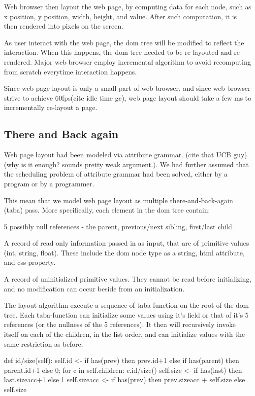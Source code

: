 \documentclass[format=acmsmall, review=false, screen=true]{acmart}
\begin{document}
Web browser then layout the web page, by computing data for each node, such as x position, y position, width, height, and value. After such computation, it is then rendered into pixels on the screen.

As user interact with the web page, the dom tree will be modified to reflect the interaction. When this happens, the dom-tree needed to be re-layouted and re-rendered. Major web browser employ incremental algorithm to avoid recomputing from scratch everytime interaction happens.

Since web page layout is only a small part of web browser, and since web browser strive to achieve 60fps(cite idle time gc), web page layout should take a few ms to incrementally re-layout a page.

\subsection{There and Back again}
Web page layout had been modeled via attribute grammar. (cite that UCB guy). (why is it enough? sounds pretty weak argument.). We had further assumed that the scheduling problem of attribute grammar had been solved, either by a program or by a programmer.

This mean that we model web page layout as multiple there-and-back-again (taba) pass. More specifically, each element in the dom tree contain:

5 possibly null references - the parent, previous/next sibling, first/last child.

A record of read only information passed in as input, that are of primitive values (int, string, float). These include the dom node type as a string, html attribute, and css property.

A record of uninitialized primitive values. They cannot be read before initializing, and no modification can occur beside from an initialization.

The layout algorithm execute a sequence of taba-function on the root of the dom tree. Each taba-function can initialize some values using it's field or that of it's 5 references (or the nullness of the 5 references). It then will recursively invoke itself on each of the children, in the list order, and can initialize values with the same restriction as before.

def id/size(self):
  self.id <-
    if has(prev) then prev.id+1
    else if has(parent) then parent.id+1
    else 0;
  for c in self.children:
    c.id/size()
  self.size <-
    if has(last) then last.sizeacc+1
    else 1
  self.sizeacc <-
    if has(prev) then prev.sizeacc + self.size
    else self.size
\end{document}
